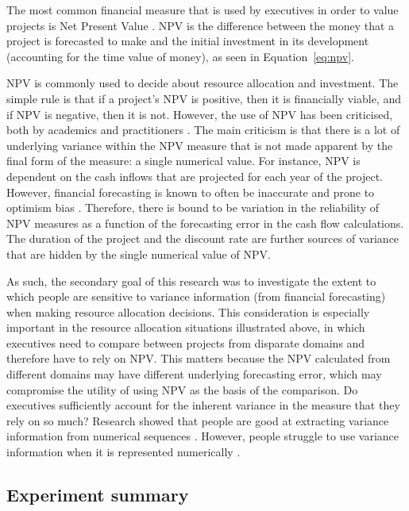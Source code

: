 \documentclass[a4paper, nobind, dvipsnames]{templates/ociamthesis}
\theoremstyle{definition}
\theoremstyle{definition}
\theoremstyle{definition}
\theoremstyle{definition}
\theoremstyle{remark}
\begin{document}
The most common financial measure that is used by executives in order to value
projects is Net Present Value \autocite[NPV;][]{graham2001}. NPV is the difference between
the money that a project is forecasted to make and the initial investment in its
development (accounting for the time value of money), as seen in
Equation~\eqref{eq:npv}.

NPV is commonly used to decide about resource allocation and investment. The
simple rule is that if a project's NPV is positive, then it is financially
viable, and if NPV is negative, then it is not. However, the use of NPV has been
criticised, both by academics and practitioners \autocite{fox2008,willigers2017}. The
main criticism is that there is a lot of underlying variance within the NPV
measure that is not made apparent by the final form of the measure: a single
numerical value. For instance, NPV is dependent on the cash inflows that are
projected for each year of the project. However, financial forecasting is known
to often be inaccurate and prone to optimism bias \autocite{lovallo2003,puri2007}.
Therefore, there is bound to be variation in the reliability of NPV measures as
a function of the forecasting error in the cash flow calculations. The duration
of the project and the discount rate are further sources of variance that are
hidden by the single numerical value of NPV.

As such, the secondary goal of this research was to investigate the extent to
which people are sensitive to variance information (from financial forecasting)
when making resource allocation decisions. This consideration is especially
important in the resource allocation situations illustrated above, in which
executives need to compare between projects from disparate domains and therefore
have to rely on NPV. This matters because the NPV calculated from different
domains may have different underlying forecasting error, which may compromise
the utility of using NPV as the basis of the comparison. Do executives
sufficiently account for the inherent variance in the measure that they rely on
so much? Research showed that people are good at extracting variance information
from numerical sequences \autocite{rosenbaum2020}. However, people struggle to use
variance information when it is represented numerically \autocite{galesic2010,konold1993,vivalt2018,batteux2020}.

\subsection{Experiment summary}
\end{document}
